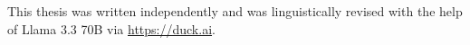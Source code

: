 


This thesis was written independently and was linguistically revised with the help of Llama 3.3 70B via \url{https://duck.ai}.
